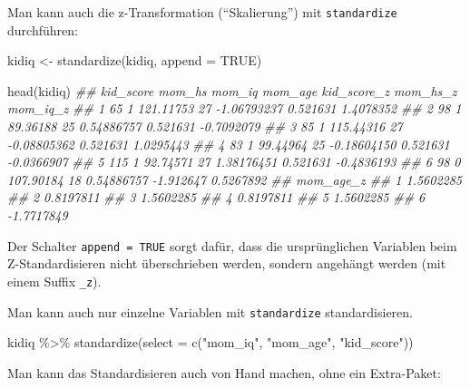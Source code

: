 \documentclass[
  a4paper,
  DIV=11]{scrreprt}
\newenvironment{Shaded}{\begin{snugshade}}{\end{snugshade}}
\newcommand{\AttributeTok}[1]{\textcolor[rgb]{0.40,0.45,0.13}{#1}}
\newcommand{\ConstantTok}[1]{\textcolor[rgb]{0.56,0.35,0.01}{#1}}
\newcommand{\DocumentationTok}[1]{\textcolor[rgb]{0.37,0.37,0.37}{\textit{#1}}}
\newcommand{\FunctionTok}[1]{\textcolor[rgb]{0.28,0.35,0.67}{#1}}
\newcommand{\NormalTok}[1]{\textcolor[rgb]{0.00,0.23,0.31}{#1}}
\newcommand{\OtherTok}[1]{\textcolor[rgb]{0.00,0.23,0.31}{#1}}
\newcommand{\SpecialCharTok}[1]{\textcolor[rgb]{0.37,0.37,0.37}{#1}}
\newcommand{\StringTok}[1]{\textcolor[rgb]{0.13,0.47,0.30}{#1}}
\theoremstyle{definition}
\theoremstyle{remark}
\begin{document}
Man kann auch die z-Transformation (``Skalierung'') mit
\texttt{standardize} durchführen:

\begin{Shaded}
\begin{Highlighting}[]
\NormalTok{kidiq }\OtherTok{\textless{}{-}} 
  \FunctionTok{standardize}\NormalTok{(kidiq, }\AttributeTok{append =} \ConstantTok{TRUE}\NormalTok{)}

\FunctionTok{head}\NormalTok{(kidiq)}
\DocumentationTok{\#\#   kid\_score mom\_hs    mom\_iq mom\_age kid\_score\_z  mom\_hs\_z   mom\_iq\_z}
\DocumentationTok{\#\# 1        65      1 121.11753      27 {-}1.06793237  0.521631  1.4078352}
\DocumentationTok{\#\# 2        98      1  89.36188      25  0.54886757  0.521631 {-}0.7092079}
\DocumentationTok{\#\# 3        85      1 115.44316      27 {-}0.08805362  0.521631  1.0295443}
\DocumentationTok{\#\# 4        83      1  99.44964      25 {-}0.18604150  0.521631 {-}0.0366907}
\DocumentationTok{\#\# 5       115      1  92.74571      27  1.38176451  0.521631 {-}0.4836193}
\DocumentationTok{\#\# 6        98      0 107.90184      18  0.54886757 {-}1.912647  0.5267892}
\DocumentationTok{\#\#    mom\_age\_z}
\DocumentationTok{\#\# 1  1.5602285}
\DocumentationTok{\#\# 2  0.8197811}
\DocumentationTok{\#\# 3  1.5602285}
\DocumentationTok{\#\# 4  0.8197811}
\DocumentationTok{\#\# 5  1.5602285}
\DocumentationTok{\#\# 6 {-}1.7717849}
\end{Highlighting}
\end{Shaded}

Der Schalter \texttt{append\ =\ TRUE} sorgt dafür, dass die
ursprünglichen Variablen beim Z-Standardisieren nicht überschrieben
werden, sondern angehängt werden (mit einem Suffix \texttt{\_z}).

Man kann auch nur einzelne Variablen mit \texttt{standardize}
standardisieren.

\begin{Shaded}
\begin{Highlighting}[]
\NormalTok{kidiq }\SpecialCharTok{\%\textgreater{}\%} 
  \FunctionTok{standardize}\NormalTok{(}\AttributeTok{select =} \FunctionTok{c}\NormalTok{(}\StringTok{"mom\_iq"}\NormalTok{, }\StringTok{"mom\_age"}\NormalTok{, }\StringTok{"kid\_score"}\NormalTok{))}
\end{Highlighting}
\end{Shaded}

Man kann das Standardisieren auch von Hand machen, ohne ein Extra-Paket:
\end{document}
